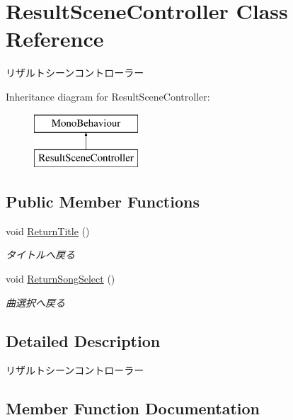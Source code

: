 \hypertarget{class_result_scene_controller}{}\section{Result\+Scene\+Controller Class Reference}
\label{class_result_scene_controller}


リザルトシーンコントローラー  


Inheritance diagram for Result\+Scene\+Controller\+:\begin{figure}[H]
\begin{center}
\leavevmode
\includegraphics[height=2.000000cm]{class_result_scene_controller}
\end{center}
\end{figure}
\subsection*{Public Member Functions}
\begin{DoxyCompactItemize}
\item 
void \hyperlink{class_result_scene_controller_aa9865e524bbd9008a55c0b164240d3df}{Return\+Title} ()
\begin{DoxyCompactList}\small\item\em タイトルへ戻る \end{DoxyCompactList}\item 
void \hyperlink{class_result_scene_controller_a9e1acecea437e8c311b9ffb6bec77a6d}{Return\+Song\+Select} ()
\begin{DoxyCompactList}\small\item\em 曲選択へ戻る \end{DoxyCompactList}\end{DoxyCompactItemize}


\subsection{Detailed Description}
リザルトシーンコントローラー 



\subsection{Member Function Documentation}
